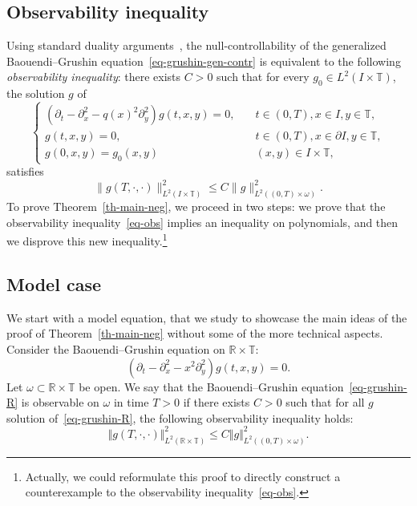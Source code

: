 \documentclass[10pt]{amsart}
\theoremstyle{definition}\newtheorem{defi}[theo]{Definition}\newtheorem{rema}[theo]{Remark}\newtheorem{exam}[theo]{Example}\newtheorem{exem}[theo]{Example}\newtheorem{nota}[theo]{Notation}
\renewcommand{\leq}{\leqslant}
\newcommand{\1}{\mathds 1}
\newcommand{\R}{\mathbb{R}}
\newcommand{\T}{\mathbb{T}}
\renewcommand{\o}{\omega}
\begin{document}
\break

\subsection{Observability inequality}
Using standard duality arguments~\cite[Theorem~2.44]{Coron07}, the null-controllability of the generalized Baouendi--Grushin equation~\eqref{eq-grushin-gen-contr} is equivalent to the following \emph{observability inequality}: there exists $C>0$ such that for every $g_0\in L^2(I\times \T)$, the solution $g$ of
\begin{equation}\label{eq-grushin-gen}
\left\{
\begin{array}{ll}
\left(\partial_t-\partial_x^2 - q(x)^2 \partial_y^2\right)g(t,x,y) = 0,&\quad t\in (0,T), x\in I, y\in \T,\\
g(t,x,y) = 0,&\quad t\in (0,T), x\in \partial I, y\in \T,\\
g(0,x,y) = g_0(x,y)&\quad (x,y) \in I\times \T,
\end{array}\right.
\end{equation}
satisfies
\begin{equation}\label{eq-obs}
\|g(T,\cdot,\cdot)\|_{L^2(I\times \T)}^2 \leq C \|g\|_{L^2((0,T)\times \o)}^2.
\end{equation}
To prove Theorem~\ref{th-main-neg}, we proceed in two steps: we prove that the observability inequality~\eqref{eq-obs} implies an inequality on polynomials, and then we disprove this new inequality.\footnote{Actually, we could reformulate this proof to directly construct a counterexample to the observability inequality~\eqref{eq-obs}.}


\subsection{Model case}

We start with a model equation, that we study to showcase the main ideas of the proof of Theorem~\ref{th-main-neg} without some of the more technical aspects. Consider the Baouendi--Grushin equation on $\R\times \T$:
\begin{equation}\label{eq-grushin-R}
\left(\partial_t -\partial_x^2 - x^2\partial_y^2\right)g(t,x,y) = 0.
\end{equation}
Let $\omega\subset \R \times \T$ be open. We say that the Baouendi--Grushin equation~\eqref{eq-grushin-R} is observable on $\o$ in time $T>0$ if there exists $C>0$ such that for all $g$ solution of~\eqref{eq-grushin-R}, the following observability inequality holds:
\begin{equation}\label{eq-obs-R}
\Vert g(T,\cdot,\cdot)\Vert^2_{L^2(\R\times \T)}
\leq C \Vert g\Vert_{L^2((0,T)\times \o)}^2.
\end{equation}
\end{document}
